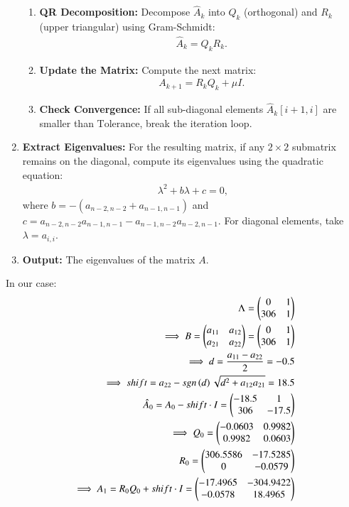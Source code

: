 \documentclass[journal]{IEEEtran}
\begin{document}
\begin{enumerate}
\begin{enumerate}
        \item \textbf{QR Decomposition:} Decompose $\hat{A}_k$ into $Q_k$ (orthogonal) and $R_k$ (upper triangular) using Gram-Schmidt:
        \begin{align}
        \hat{A}_k = Q_k R_k.
        \end{align}

        \item \textbf{Update the Matrix:} Compute the next matrix:
        \begin{align}
        A_{k+1} = R_k Q_k + \mu I.
        \end{align}

        \item \textbf{Check Convergence:} If all sub-diagonal elements $\hat{A}_k[i+1,i]$ are smaller than $\text{Tolerance}$, break the iteration loop.
    \end{enumerate}

    \item \textbf{Extract Eigenvalues:} 
    For the resulting matrix, if any $2 \times 2$ submatrix remains on the diagonal, compute its eigenvalues using the quadratic equation:
    \begin{align}
    \lambda^2 + b\lambda + c = 0,
    \end{align}
    where $b = -(a_{n-2,n-2} + a_{n-1,n-1})$ and $c = a_{n-2,n-2} a_{n-1,n-1} - a_{n-1,n-2} a_{n-2,n-1}$. For diagonal elements, take $\lambda = a_{i,i}$.
    \item \textbf{Output:} The eigenvalues of the matrix $A$.
    \newline
\end{enumerate}
In our case:
\begin{align}
    \Lambda=\begin{pmatrix}0&1\\306&1\end{pmatrix}\\
    \implies B=\begin{pmatrix}a_{11}&a_{12}\\a_{21}&a_{22}\end{pmatrix}=\begin{pmatrix}0&1\\306&1\end{pmatrix}\\
    \implies d=\frac{a_{11}-a_{22}}{2}=-0.5\\
\implies shift=a_{22}-sgn\left(d\right)\sqrt{d^2+a_{12}a_{21}}=18.5\\
    \hat{A}_0=A_0-shift\cdot I=\begin{pmatrix}-18.5&1\\306&-17.5\end{pmatrix}\\
    \implies Q_0=\begin{pmatrix}-0.0603&0.9982\\0.9982&0.0603\end{pmatrix}\\R_0=\begin{pmatrix}306.5586&-17.5285\\0&-0.0579\end{pmatrix}\\
    \implies A_1=R_0Q_0+shift\cdot I=\begin{pmatrix}-17.4965&-304.9422\\-0.0578&18.4965\end{pmatrix}
\end{align}
\end{document}
